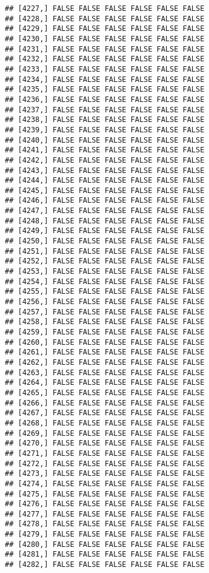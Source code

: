 \documentclass[
]{article}
\begin{document}
\begin{verbatim}
## [4227,] FALSE FALSE FALSE FALSE FALSE FALSE
## [4228,] FALSE FALSE FALSE FALSE FALSE FALSE
## [4229,] FALSE FALSE FALSE FALSE FALSE FALSE
## [4230,] FALSE FALSE FALSE FALSE FALSE FALSE
## [4231,] FALSE FALSE FALSE FALSE FALSE FALSE
## [4232,] FALSE FALSE FALSE FALSE FALSE FALSE
## [4233,] FALSE FALSE FALSE FALSE FALSE FALSE
## [4234,] FALSE FALSE FALSE FALSE FALSE FALSE
## [4235,] FALSE FALSE FALSE FALSE FALSE FALSE
## [4236,] FALSE FALSE FALSE FALSE FALSE FALSE
## [4237,] FALSE FALSE FALSE FALSE FALSE FALSE
## [4238,] FALSE FALSE FALSE FALSE FALSE FALSE
## [4239,] FALSE FALSE FALSE FALSE FALSE FALSE
## [4240,] FALSE FALSE FALSE FALSE FALSE FALSE
## [4241,] FALSE FALSE FALSE FALSE FALSE FALSE
## [4242,] FALSE FALSE FALSE FALSE FALSE FALSE
## [4243,] FALSE FALSE FALSE FALSE FALSE FALSE
## [4244,] FALSE FALSE FALSE FALSE FALSE FALSE
## [4245,] FALSE FALSE FALSE FALSE FALSE FALSE
## [4246,] FALSE FALSE FALSE FALSE FALSE FALSE
## [4247,] FALSE FALSE FALSE FALSE FALSE FALSE
## [4248,] FALSE FALSE FALSE FALSE FALSE FALSE
## [4249,] FALSE FALSE FALSE FALSE FALSE FALSE
## [4250,] FALSE FALSE FALSE FALSE FALSE FALSE
## [4251,] FALSE FALSE FALSE FALSE FALSE FALSE
## [4252,] FALSE FALSE FALSE FALSE FALSE FALSE
## [4253,] FALSE FALSE FALSE FALSE FALSE FALSE
## [4254,] FALSE FALSE FALSE FALSE FALSE FALSE
## [4255,] FALSE FALSE FALSE FALSE FALSE FALSE
## [4256,] FALSE FALSE FALSE FALSE FALSE FALSE
## [4257,] FALSE FALSE FALSE FALSE FALSE FALSE
## [4258,] FALSE FALSE FALSE FALSE FALSE FALSE
## [4259,] FALSE FALSE FALSE FALSE FALSE FALSE
## [4260,] FALSE FALSE FALSE FALSE FALSE FALSE
## [4261,] FALSE FALSE FALSE FALSE FALSE FALSE
## [4262,] FALSE FALSE FALSE FALSE FALSE FALSE
## [4263,] FALSE FALSE FALSE FALSE FALSE FALSE
## [4264,] FALSE FALSE FALSE FALSE FALSE FALSE
## [4265,] FALSE FALSE FALSE FALSE FALSE FALSE
## [4266,] FALSE FALSE FALSE FALSE FALSE FALSE
## [4267,] FALSE FALSE FALSE FALSE FALSE FALSE
## [4268,] FALSE FALSE FALSE FALSE FALSE FALSE
## [4269,] FALSE FALSE FALSE FALSE FALSE FALSE
## [4270,] FALSE FALSE FALSE FALSE FALSE FALSE
## [4271,] FALSE FALSE FALSE FALSE FALSE FALSE
## [4272,] FALSE FALSE FALSE FALSE FALSE FALSE
## [4273,] FALSE FALSE FALSE FALSE FALSE FALSE
## [4274,] FALSE FALSE FALSE FALSE FALSE FALSE
## [4275,] FALSE FALSE FALSE FALSE FALSE FALSE
## [4276,] FALSE FALSE FALSE FALSE FALSE FALSE
## [4277,] FALSE FALSE FALSE FALSE FALSE FALSE
## [4278,] FALSE FALSE FALSE FALSE FALSE FALSE
## [4279,] FALSE FALSE FALSE FALSE FALSE FALSE
## [4280,] FALSE FALSE FALSE FALSE FALSE FALSE
## [4281,] FALSE FALSE FALSE FALSE FALSE FALSE
## [4282,] FALSE FALSE FALSE FALSE FALSE FALSE

\end{verbatim}
\end{document}
